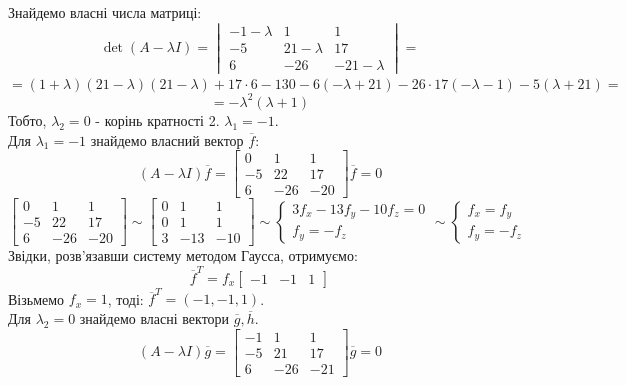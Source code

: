 \documentclass[14pt,a4paper]{scrartcl}
\theoremstyle{definition}
\theoremstyle{remark}
\theoremstyle{definition}
\theoremstyle{definition}
\begin{document}
Знайдемо власні числа матриці:
$$
\det (A  - \lambda  I ) = \begin{vmatrix}
-1 - \lambda & 1 & 1 \\
-5 & 21 - \lambda & 17 \\
6 & -26 & -21- \lambda
\end{vmatrix}=
$$
$
 =  ( 1 + \lambda) ( 21 - \lambda) ( 21 - \lambda) + 17\cdot 6 -130 - 6 ( -\lambda + 21  ) - 26\cdot 17 ( - \lambda - 1 ) -5 ( \lambda + 21) =
$
$$
= - \lambda^2 ( \lambda + 1)
$$
Тобто, $ \lambda_2 = 0 $ - корінь кратності 2. $ \lambda_1 = -1$.\\
Для $ \lambda_1 = -1 $ знайдемо власний вектор $ \overline{f}$:
$$
(A - \lambda I)\overline{f} = \begin{bmatrix}
0 & 1 & 1\\
-5 & 22 & 17 \\
6 & -26 & -20
\end{bmatrix} \overline{f} = 0
$$
$$
\begin{bmatrix}
0 & 1 & 1\\
-5 & 22 & 17 \\
6 & -26 & -20
\end{bmatrix} \sim \begin{bmatrix}
 0 & 1 & 1 \\
 0 & 1 & 1 \\
 3 & -13 & -10
\end{bmatrix} \sim \left\lbrace \begin{gathered}
  3f_x -13 f_y - 10f_z = 0\\
	f_y = -f_z
\end{gathered} \right.  \sim \left\lbrace
\begin{gathered}
	f_x = f_y\\
	f_y = -f_z
\end{gathered}
 \right.
$$
Звідки, розв'язавши систему методом Гаусса, отримуємо:
$$
\overline{f}^T = f_x \begin{bmatrix}
-1 & -1 & 1
\end{bmatrix}
$$
Візьмемо $f_x = 1$, тоді: $ \overline{f}^T  = (-1, -1, 1)$.\\
Для $ \lambda_2 = 0$ знайдемо власні вектори $ \overline{g}, \overline{h}$.
$$(A - \lambda I)\overline{g} = \begin{bmatrix}
 -1 & 1 & 1 \\
 -5 & 21 & 17 \\
 6 & -26 & -21
\end{bmatrix}\overline{g} = 0 $$
\end{document}
